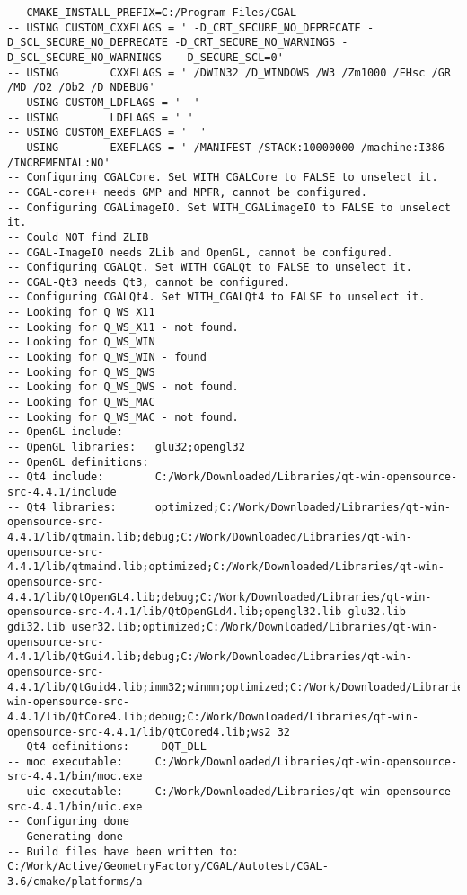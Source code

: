 {\begin{verbatim}
-- CMAKE_INSTALL_PREFIX=C:/Program Files/CGAL
-- USING CUSTOM_CXXFLAGS = ' -D_CRT_SECURE_NO_DEPRECATE -D_SCL_SECURE_NO_DEPRECATE -D_CRT_SECURE_NO_WARNINGS -D_SCL_SECURE_NO_WARNINGS   -D_SECURE_SCL=0'
-- USING        CXXFLAGS = ' /DWIN32 /D_WINDOWS /W3 /Zm1000 /EHsc /GR /MD /O2 /Ob2 /D NDEBUG'
-- USING CUSTOM_LDFLAGS = '  '
-- USING        LDFLAGS = ' '
-- USING CUSTOM_EXEFLAGS = '  '
-- USING        EXEFLAGS = ' /MANIFEST /STACK:10000000 /machine:I386 /INCREMENTAL:NO'
-- Configuring CGALCore. Set WITH_CGALCore to FALSE to unselect it.
-- CGAL-core++ needs GMP and MPFR, cannot be configured.
-- Configuring CGALimageIO. Set WITH_CGALimageIO to FALSE to unselect it.
-- Could NOT find ZLIB
-- CGAL-ImageIO needs ZLib and OpenGL, cannot be configured.
-- Configuring CGALQt. Set WITH_CGALQt to FALSE to unselect it.
-- CGAL-Qt3 needs Qt3, cannot be configured.
-- Configuring CGALQt4. Set WITH_CGALQt4 to FALSE to unselect it.
-- Looking for Q_WS_X11
-- Looking for Q_WS_X11 - not found.
-- Looking for Q_WS_WIN
-- Looking for Q_WS_WIN - found
-- Looking for Q_WS_QWS
-- Looking for Q_WS_QWS - not found.
-- Looking for Q_WS_MAC
-- Looking for Q_WS_MAC - not found.
-- OpenGL include:     
-- OpenGL libraries:   glu32;opengl32
-- OpenGL definitions: 
-- Qt4 include:        C:/Work/Downloaded/Libraries/qt-win-opensource-src-4.4.1/include
-- Qt4 libraries:      optimized;C:/Work/Downloaded/Libraries/qt-win-opensource-src-4.4.1/lib/qtmain.lib;debug;C:/Work/Downloaded/Libraries/qt-win-opensource-src-4.4.1/lib/qtmaind.lib;optimized;C:/Work/Downloaded/Libraries/qt-win-opensource-src-4.4.1/lib/QtOpenGL4.lib;debug;C:/Work/Downloaded/Libraries/qt-win-opensource-src-4.4.1/lib/QtOpenGLd4.lib;opengl32.lib glu32.lib gdi32.lib user32.lib;optimized;C:/Work/Downloaded/Libraries/qt-win-opensource-src-4.4.1/lib/QtGui4.lib;debug;C:/Work/Downloaded/Libraries/qt-win-opensource-src-4.4.1/lib/QtGuid4.lib;imm32;winmm;optimized;C:/Work/Downloaded/Libraries/qt-win-opensource-src-4.4.1/lib/QtCore4.lib;debug;C:/Work/Downloaded/Libraries/qt-win-opensource-src-4.4.1/lib/QtCored4.lib;ws2_32
-- Qt4 definitions:    -DQT_DLL
-- moc executable:     C:/Work/Downloaded/Libraries/qt-win-opensource-src-4.4.1/bin/moc.exe
-- uic executable:     C:/Work/Downloaded/Libraries/qt-win-opensource-src-4.4.1/bin/uic.exe
-- Configuring done
-- Generating done
-- Build files have been written to: C:/Work/Active/GeometryFactory/CGAL/Autotest/CGAL-3.6/cmake/platforms/a
\end{verbatim}
}




